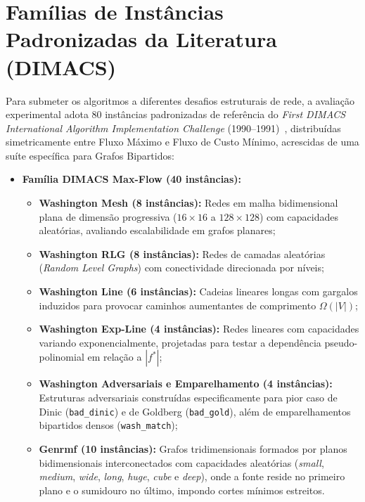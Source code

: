 \section{Famílias de Instâncias Padronizadas da Literatura (DIMACS)}\label{sec:bench_instancias}

Para submeter os algoritmos a diferentes desafios estruturais de rede, a avaliação experimental adota 80 instâncias padronizadas de referência do \textit{First DIMACS International Algorithm Implementation Challenge} (1990--1991)~\cite{Jensen2022, ahuja1993network}, distribuídas simetricamente entre Fluxo Máximo e Fluxo de Custo Mínimo, acrescidas de uma suíte específica para Grafos Bipartidos:

\begin{itemize}
    \item \textbf{Família DIMACS Max-Flow (40 instâncias):}
    \begin{itemize}
        \item \textbf{Washington Mesh (8 instâncias):} Redes em malha bidimensional plana de dimensão progressiva ($16 \times 16$ a $128 \times 128$) com capacidades aleatórias, avaliando escalabilidade em grafos planares;
        \item \textbf{Washington RLG (8 instâncias):} Redes de camadas aleatórias (\textit{Random Level Graphs}) com conectividade direcionada por níveis;
        \item \textbf{Washington Line (6 instâncias):} Cadeias lineares longas com gargalos induzidos para provocar caminhos aumentantes de comprimento $\Omega(|V|)$;
        \item \textbf{Washington Exp-Line (4 instâncias):} Redes lineares com capacidades variando exponencialmente, projetadas para testar a dependência pseudo-polinomial em relação a $|f^*|$;
        \item \textbf{Washington Adversariais e Emparelhamento (4 instâncias):} Estruturas adversariais construídas especificamente para pior caso de Dinic (\texttt{bad\_dinic}) e de Goldberg (\texttt{bad\_gold}), além de emparelhamentos bipartidos densos (\texttt{wash\_match});
        \item \textbf{Genrmf (10 instâncias):} Grafos tridimensionais formados por planos bidimensionais interconectados com capacidades aleatórias (\textit{small}, \textit{medium}, \textit{wide}, \textit{long}, \textit{huge}, \textit{cube} e \textit{deep}), onde a fonte reside no primeiro plano e o sumidouro no último, impondo cortes mínimos estreitos.
    \end{itemize}


\end{itemize}
